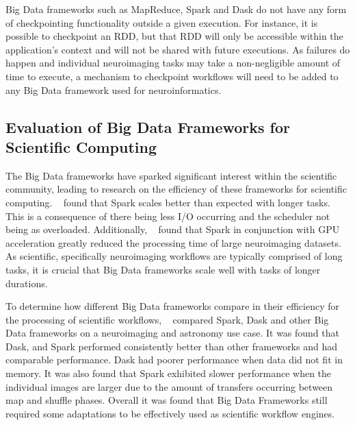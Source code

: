             Big Data frameworks such as MapReduce, Spark and Dask do not have   
            any form of checkpointing functionality outside a given          
            execution. For instance, it is possible to checkpoint an RDD, but   
            that RDD will only be accessible within the application's context   
            and will not be shared with future executions. As failures do       
            happen and individual neuroimaging tasks may take a non-negligible  
            amount of time to execute, a mechanism to checkpoint workflows      
            will need to be added to any Big Data framework used for
            neuroinformatics.                                                   

                                                                                
        \subsection{Evaluation of Big Data Frameworks for Scientific
        Computing}\label{eval}     
            The Big Data frameworks have sparked significant interest within the
            scientific community, leading to research on the efficiency of      
            these frameworks for scientific computing. ~\cite{souza2017spark}
            found  
            that Spark scales better than expected with longer tasks. This is   
            a consequence of there being less I/O occurring and the scheduler
            not being as overloaded. Additionally, ~\cite{boubela2016big} found
            that Spark in conjunction with  
            GPU acceleration greatly reduced the processing time of large       
            neuroimaging datasets.                                              
            As scientific, specifically neuroimaging workflows are typically    
            comprised of long tasks, it                                         
            is crucial that Big Data frameworks scale well with tasks of longer
            durations.
    
            To determine how different Big Data frameworks compare in their
            efficiency for the processing of scientific workflows,
            ~\cite{mehta2017comparative} compared Spark, Dask and other Big Data
            frameworks on a neuroimaging and astronomy use case. It was found
            that Dask, and Spark performed consistently better than other
            frameworks and had comparable performance. Dask had poorer
            performance when data did not fit in memory. It was also found that
            Spark exhibited slower performance when the individual images are
            larger due to the amount of transfers occurring between map and
            shuffle phases. Overall it was found that Big Data Frameworks still
            required some adaptations to be effectively used as scientific
            workflow engines.            
            
